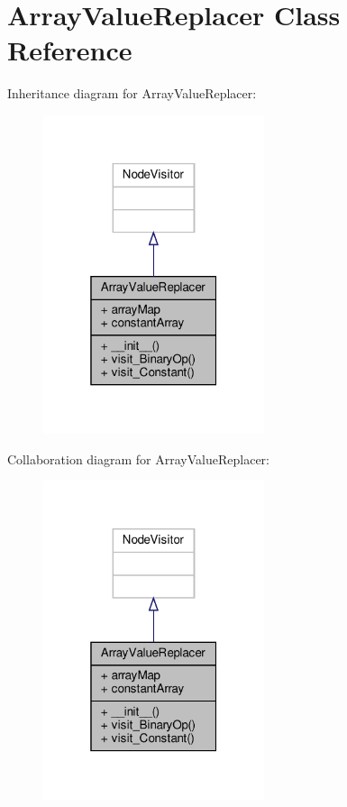 \hypertarget{classVisitors_1_1ArrayValueReplacer}{}\section{Array\+Value\+Replacer Class Reference}
\label{classVisitors_1_1ArrayValueReplacer}


Inheritance diagram for Array\+Value\+Replacer\+:\nopagebreak
\begin{figure}[H]
\begin{center}
\leavevmode
\includegraphics[width=184pt]{classVisitors_1_1ArrayValueReplacer__inherit__graph}
\end{center}
\end{figure}


Collaboration diagram for Array\+Value\+Replacer\+:\nopagebreak
\begin{figure}[H]
\begin{center}
\leavevmode
\includegraphics[width=184pt]{classVisitors_1_1ArrayValueReplacer__coll__graph}
\end{center}
\end{figure}
